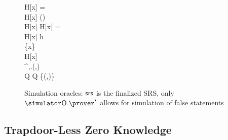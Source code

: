 

\begin{figure}
	\centering
		\begin{pcvstack}
		\begin{pchstack}
			{
			\pcif H[x] = \bot \pcthen \\
			\pcind H[x] \sample {}(\ro) \\
			\pcreturn H[x]
			  }
			\pchspace
			{ 
				\pcif H[x] = \bot \pcthen \\ 
				\pcind H[x] \gets h \\
				\pcind \Qprog \gets \Qprog \cup \{x\}\\
				\pcreturn H[x]
			}
			\pchspace
			{ 
				\boxed{\pcassert (\inp,\wit)\in \REL} \\ 
				\pi \gets \simulator^{\simOH,\simulator\oracleo.\prog}(\srs,\inp)\\
				Q \gets Q \cup \{(\inp,\pi)\}\\
				\pcreturn \pi
			}
		\end{pchstack}
	\end{pcvstack}
	\caption{Simulation oracles: $\mathsf{srs}$ is the finalized SRS, only $\simOP'$ allows for simulation of false statements}
	\label{fig:real_simulator_oracles}
\end{figure}

\subsection{Trapdoor-Less Zero Knowledge}







